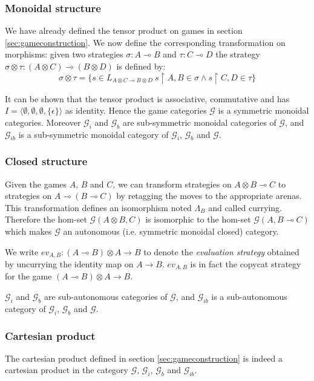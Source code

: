 \subsubsection{Monoidal structure}

We have already defined the tensor product on games in section \ref{sec:gameconstruction}.
We now define the corresponding transformation on morphisms:
given two strategies $\sigma : A \multimap B$ and $\tau : C \multimap D$ the strategy
$\sigma \otimes \tau : (A \otimes C) \multimap (B\otimes D)$ is defined by:
$$ \sigma \otimes \tau = \{ s \in L_{A \otimes C \multimap B\otimes D} \ s \upharpoonright A,B \in \sigma
\wedge s \upharpoonright C,D \in \tau \}$$

It can be shown that the tensor product is associative, commutative and has
$I = \langle \emptyset, \emptyset,\emptyset, \{ \epsilon \} \rangle $ as identity.
Hence the game categories $\mathcal{G}$ is a symmetric monoidal categories. Moreover
$\mathcal{G}_i$ and  $\mathcal{G}_b$ are sub-symmetric monoidal categories of $\mathcal{G}$,
and $\mathcal{G}_{ib}$ is a sub-symmetric monoidal category of $\mathcal{G}_i$, $\mathcal{G}_b$ and
$\mathcal{G}$.

\subsubsection{Closed structure}

Given the games $A$, $B$ and $C$, we can transform strategies on $A\otimes B \multimap C$ to
strategies on $A \multimap (B \multimap C)$ by retagging the moves to the appropriate arenas. This transformation
defines an isomorphism noted $\Lambda_B$ and called currying. Therefore the hom-set $\mathcal{G}(A\otimes B, C)$ is isomorphic to the hom-set
$\mathcal{G}(A,B\multimap C)$ which makes $\mathcal{G}$ an autonomous (i.e. symmetric monoidal closed) category.

We write $ev_{A,B} : (A \multimap B) \otimes A \rightarrow B$ to denote the \emph{evaluation strategy} obtained by uncurrying the
identity map on $A \rightarrow B$. $ev_{A,B}$ is in fact the copycat strategy for the game
$(A \multimap B) \otimes A \rightarrow B$.

$\mathcal{G}_i$ and  $\mathcal{G}_b$ are sub-autonomous categories of $\mathcal{G}$,
and $\mathcal{G}_{ib}$ is a sub-autonomous category of $\mathcal{G}_i$, $\mathcal{G}_b$ and
$\mathcal{G}$.

\subsubsection{Cartesian product}
The cartesian product defined in section \ref{sec:gameconstruction} is indeed a cartesian product in the category
$\mathcal{G}$, $\mathcal{G}_i$, $\mathcal{G}_b$ and $\mathcal{G}_{ib}$.

